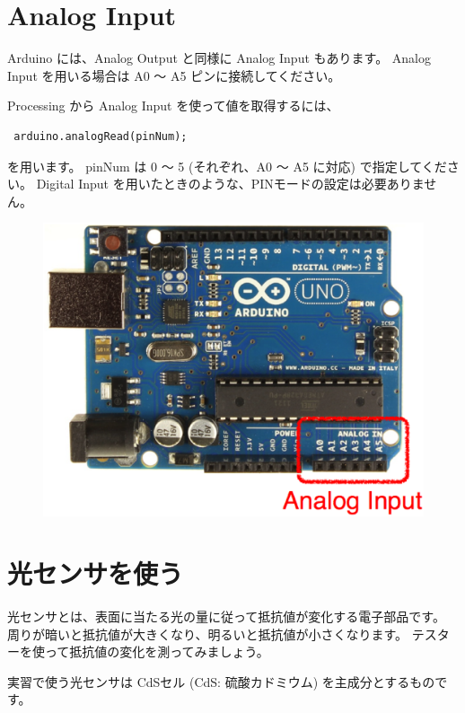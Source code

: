 \documentclass[11pt,a4paper]{jarticle}
\begin{document}
\section{Analog Input}
Arduino には、Analog Output と同様に Analog Input もあります。
Analog Input を用いる場合は A0 〜 A5 ピンに接続してください。

Processing から Analog Input を使って値を取得するには、
\begin{lstlisting}
 arduino.analogRead(pinNum);
\end{lstlisting}
を用います。
pinNum は 0 〜 5 (それぞれ、A0 〜 A5 に対応) で指定してください。
Digital Input を用いたときのような、PINモードの設定は必要ありません。

\begin{figure}[h!]
 \centering
 \includegraphics[width=0.4\columnwidth]{img/analog_input_pins.eps}
\end{figure}

\section{光センサを使う}
光センサとは、表面に当たる光の量に従って抵抗値が変化する電子部品です。
周りが暗いと抵抗値が大きくなり、明るいと抵抗値が小さくなります。
テスターを使って抵抗値の変化を測ってみましょう。

実習で使う光センサは CdSセル (CdS: 硫酸カドミウム) を主成分とするものです。
\end{document}
